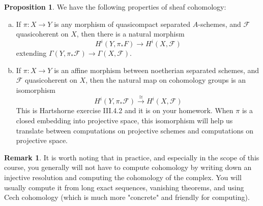 \documentclass[10pt,reqno]{amsart}
\theoremstyle{definition}
\newtheorem{proposition}[theorem]{Proposition}
\newtheorem{remark}[theorem]{Remark}
\theoremstyle{remark}
\numberwithin{equation}{section}
\numberwithin{theorem}{section}
\newcommand*{\red}{\textcolor{red}}
\newcommand{\FF}{{\mathscr F}}
\newcommand{\GG}{{\mathscr G}}
\begin{document}
\begin{proposition} We have the following properties of sheaf cohomology:
\begin{enumerate}[(a)]
\item If $\pi: X\to Y$ is any morphism of quasicompact separated $A$-schemes, and $\FF$ quasicoherent on $X$, then there is a natural morphism
\[H^i(Y,\pi_* F) \to H^i(X,\FF)\]
extending $\Gamma(Y,\pi_* \FF) \to \Gamma(X,\FF)$. %
\item If $\pi: X \to Y$ is an affine morphism between noetherian separated schemes, and $\FF$ quasicoherent on $X$, then the natural map on cohomology groups is an isomorphism
\[H^i(Y, \pi_* \FF) \stackrel{\cong}{\longrightarrow} H^i(X,\FF)\]
This is Hartshorne exercise III.4.2 and it is on your homework.
When $\pi$ is a closed embedding into projective space, this isomorphism will help us translate between computations on projective schemes and computations on projective space. 
\end{enumerate}
\end{proposition}

\begin{remark} It is worth noting that in practice, and especially in the scope of this course, you generally will not have to compute cohomology by writing down an injective resolution and computing the cohomology of the complex. You will usually compute it from long exact sequences, vanishing theorems, and using Cech cohomology (which is much more "concrete" and friendly for computing).
\end{remark}
\end{document}
